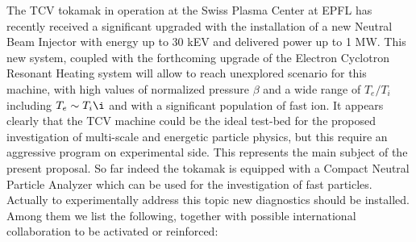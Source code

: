 \documentclass[12pt,a4paper]{article}
\begin{document}
The TCV tokamak in operation at the Swiss Plasma Center at EPFL has 
recently received a significant upgraded with the installation of a new Neutral Beam
Injector with energy up to 30 kEV and delivered power up to 1 MW. This
new system, coupled with the forthcoming upgrade of the Electron
Cyclotron Resonant Heating system will allow to reach unexplored
scenario for this machine, with high values of normalized pressure $\beta$ and a wide range of
$T_e/T_i$ including $T_e\sim T_i\i$ and with a significant population
of fast ion. It appears clearly that the TCV machine could be the
ideal test-bed for the proposed investigation of multi-scale and
energetic particle physics, but this require an aggressive program on
experimental side. This represents the main subject of the present proposal. 
So far indeed the tokamak is equipped with a
Compact Neutral Particle Analyzer which can be used for the
investigation of fast particles. Actually to experimentally address
this topic new diagnostics should be installed. Among them we list the
following, together with possible international collaboration to be activated or reinforced:
\end{document}
